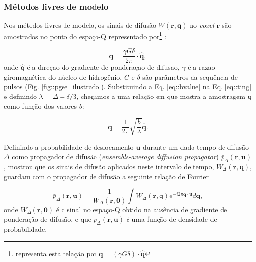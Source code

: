 \documentclass[
    12pt,                %
    oneside,            %
    a4paper,            %
    english,            %
    french,                %
    spanish,            %
    brazil                %
    ]{abntex2}
\begin{document}
\subsubsection{Métodos livres de modelo}
\label{metodos_livres_de_modelo}

Nos métodos livres de modelo, os sinais de difusão $W(\mathbf{r}, \mathbf{q})$ no \textit{voxel} $\mathbf{r}$ são amostrados no ponto do espaço-Q representado por\footnote{ representa esta relação por $\mathbf{q} = (\gamma G \delta)\cdot \mathbf{\hat{q}}$} \cite{yeh2010}:

\begin{equation}
    \label{eq::ting}
    \mathbf{q} = \frac{\gamma G \delta}{2\pi} \cdot \mathbf{\hat{q}},
\end{equation}
onde $\mathbf{\hat{q}}$ é a direção do gradiente de ponderação de difusão, $\gamma$ é a razão giromagnética do núcleo de hidrogênio, $G$ e $\delta$ são parâmetros da sequência de pulsos (Fig. \ref{fig::pgse_ilustrado}). Substituindo a Eq. \ref{eq::bvalue} na Eq. \ref{eq::ting} e definindo $\lambda = \Delta - \delta/3$, chegamos a uma relação em que mostra a amostragem $\mathbf{q}$ como função dos valores $b$:

\begin{equation}
\label{eq::qspace_bvalue}
\mathbf{q} = \frac{1}{2\pi}\sqrt{\frac{b}{\lambda}} \mathbf{\hat{q}}.
\end{equation}

Definindo a probabilidade de deslocamento $\mathbf{u}$ durante um dado tempo de difusão $\Delta$ como propagador de difusão (\textit{ensemble-average diffusion propagator}) $\bar{p}_{\Delta}(\mathbf{r}, \mathbf{u})$,  mostrou que os sinais de difusão aplicados neste intervalo de tempo, $W_{\Delta}(\mathbf{r}, \mathbf{q})$, guardam com o propagador de difusão a seguinte relação de Fourier 


\begin{equation}
\label{eq::propagator}
    \bar{p}_{\Delta}(\mathbf{r}, \mathbf{u}) =\frac{1}{W_{\Delta}(\mathbf{r},\mathbf{0}) } \int W_{\Delta}(\mathbf{r},\mathbf{q}) e^{-i2 \pi \mathbf{q} \cdot \mathbf{u}} d \mathbf{q} ,
\end{equation}
onde $W_{\Delta}(\mathbf{r},\mathbf{0})$ é o sinal no espaço-Q obtido na ausência de gradiente de ponderação de difusão, e que $\bar{p}_{\Delta}(\mathbf{r}, \mathbf{u})$ é uma função de densidade de probabilidade.
\end{document}
